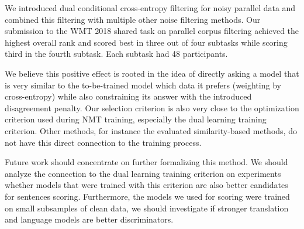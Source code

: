 \documentclass[11pt,a4paper]{article}
\begin{document}
We introduced dual conditional cross-entropy filtering for noisy parallel data and combined this filtering with multiple other noise filtering methods. Our submission to the WMT 2018 shared task on parallel corpus filtering achieved the highest overall rank and scored best in three out of four subtasks while scoring third in the fourth subtask. Each subtask had 48 participants. 

We believe this positive effect is rooted in the idea of directly asking a model that is very similar to the to-be-trained model which data it prefers (weighting by cross-entropy) while also constraining its answer with the introduced disagreement penalty. Our selection criterion is also very close to the optimization criterion used during NMT training, especially the dual learning training criterion. Other methods, for instance the evaluated similarity-based methods, do not have this direct connection to the training process. 

Future work should concentrate on further formalizing this method. We should analyze the connection to the dual learning training criterion on experiments whether models that were trained with this criterion are also better candidates for sentences scoring. Furthermore, the models we used for scoring were trained on small subsamples of clean data, we should investigate if stronger translation and language models are better discriminators. 





\end{document}
